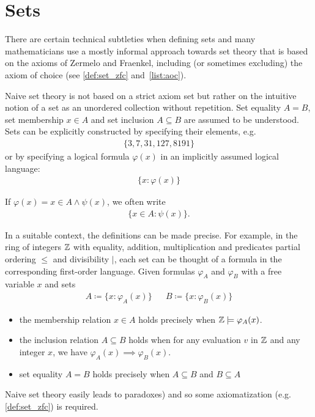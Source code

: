 \section{Sets}\label{sec:sets}

There are certain technical subtleties when defining sets and many mathematicians use a mostly informal approach towards set theory that is based on the axioms of Zermelo and Fraenkel, including (or sometimes excluding) the axiom of choice (see \ref{def:set_zfc} and~\cref{list:aoc}).

\begin{definition}\label{def:set_naive}\cite[Chapter 1]{Enderton1977}
  Naive set theory is not based on a strict axiom set but rather on the intuitive notion of a set as an unordered collection without repetition. Set equality $A = B$, set membership $x \in A$ and set inclusion $A \subseteq B$ are assumed to be understood. Sets can be explicitly constructed by specifying their elements, e.g.
  \begin{align*}
    \{ 3, 7, 31, 127, 8191 \}
  \end{align*}
  or by specifying a logical formula $\varphi(x)$ in an implicitly assumed logical language:
  \begin{align*}
    \{ x \colon \varphi(x) \}
  \end{align*}

  If $\varphi(x) = x \in A \land \psi(x)$, we often write
  \begin{align*}
    \{ x \in A \colon \psi(x) \}.
  \end{align*}

  In a suitable context, the definitions can be made precise. For example, in the ring of integers $\mathbb Z$ with equality, addition, multiplication and predicates partial ordering $\leq$ and divisibility $\vert$, each set can be thought of a formula in the corresponding first-order language. Given formulas $\varphi_A$ and $\varphi_B$ with a free variable $x$ and sets
  \begin{align*}
    A \coloneqq \{ x \colon \varphi_A(x) \} && B \coloneqq \{ x \colon \varphi_B(x) \}
  \end{align*}

  \begin{itemize}
    \item the membership relation $x \in A$ holds precisely when $\mathbb Z \models \varphi_A(x)$.

    \item the inclusion relation $A \subseteq B$ holds when for any evaluation $v$ in $\mathbb Z$ and any integer $x$, we have $\varphi_A(x) \implies \varphi_B(x)$.

    \item set equality $A = B$ holds precisely when $A \subseteq B$ and $B \subseteq A$
  \end{itemize}

  Naive set theory easily leads to paradoxes) and so some axiomatization (e.g. \cref{def:set_zfc}) is required.
\end{definition}

